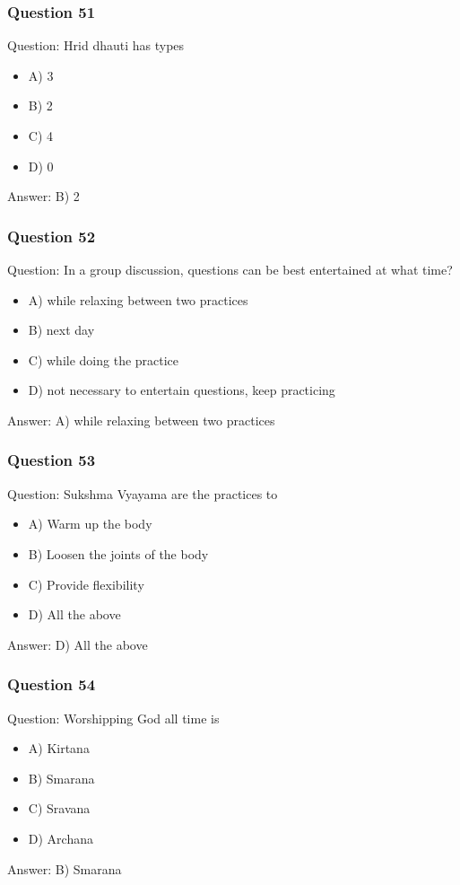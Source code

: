 \begin{frame}[fragile]\frametitle{Question 51}
Question: Hrid dhauti has types
\begin{itemize}
\item A) 3
\item B) 2
\item C) 4
\item D) 0
\end{itemize}
Answer: B) 2
\end{frame}

\begin{frame}[fragile]\frametitle{Question 52}
Question: In a group discussion, questions can be best entertained at what time?
\begin{itemize}
\item A) while relaxing between two practices
\item B) next day
\item C) while doing the practice
\item D) not necessary to entertain questions, keep practicing
\end{itemize}
Answer: A) while relaxing between two practices
\end{frame}

\begin{frame}[fragile]\frametitle{Question 53}
Question: Sukshma Vyayama are the practices to
\begin{itemize}
\item A) Warm up the body
\item B) Loosen the joints of the body
\item C) Provide flexibility
\item D) All the above
\end{itemize}
Answer: D) All the above
\end{frame}

\begin{frame}[fragile]\frametitle{Question 54}
Question: Worshipping God all time is
\begin{itemize}
\item A) Kirtana
\item B) Smarana
\item C) Sravana
\item D) Archana
\end{itemize}
Answer: B) Smarana
\end{frame}


